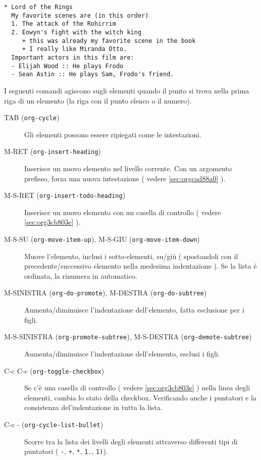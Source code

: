 \documentclass[11pt]{article}
\begin{document}
\begin{verbatim}
* Lord of the Rings
  My favorite scenes are (in this order)
  1. The attack of the Rohirrim
  2. Eowyn's fight with the witch king
     + this was already my favorite scene in the book
     + I really like Miranda Otto.
  Important actors in this film are:
  - Elijah Wood :: He plays Frodo
  - Sean Astin :: He plays Sam, Frodo's friend.
\end{verbatim}

I seguenti comandi agiscono sugli elementi quando il punto si trova
nella prima riga di un elemento (la riga con il punto elenco o il
numero).

\begin{description}
\item[{TAB (\texttt{org-cycle})}] Gli elementi possono essere ripiegati come le intestazioni.

\item[{M-RET (\texttt{org-insert-heading})}] Inserisce un nuovo elemento nel livello corrente. Con un argomento
prefisso, forza una nuova intestazione ( vedere \ref{sec:orgcad88a0} ).

\item[{M-S-RET (\texttt{org-insert-todo-heading})}] Inserisce un nuovo elemento con un casella di controllo ( vedere
\ref{sec:org3cb803e} ).

\item[{M-S-SU (\texttt{org-move-item-up}), M-S-GIU (\texttt{org-move-item-down})}] Muove l'elemento, inclusi i sotto-elementi, su/giù ( spostandoli con
il precedente/successivo elemento nella medesima indentazione ). Se
la lista é ordinata, la rinumera in automatico.

\item[{M-SINISTRA (\texttt{org-do-promote}), M-DESTRA (\texttt{org-do-subtree})}] Aumenta/diminuisce l'indentazione dell'elemento, fatta esclusione
per i figli.

\item[{M-S-SINISTRA (\texttt{org-promote-subtree}), M-S-DESTRA (\texttt{org-demote-subtree})}] Aumenta/diminuisce l'indentazione dell'elemento, esclusi i figli.

\item[{C-c C-c (\texttt{org-toggle-checkbox})}] Se c'è una casella di controllo ( vedere \ref{sec:org3cb803e} ) nella linea
degli elementi, cambia lo stato della checkbox. Verificando anche i
puntatori e la consistenza del'indentazione in tutta la lista.

\item[{C-c - (\texttt{org-cycle-list-bullet})}] Scorre tra la lista dei livelli degli elementi attraverso
differenti tipi di puntatori ( \texttt{-}, \texttt{+}, \texttt{*}, \texttt{1.}, \texttt{1)}).
\end{description}
\end{document}

